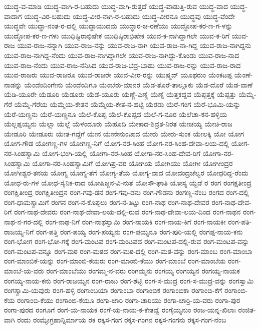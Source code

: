 ಯುದ್ಧ-ವ-ಮಾಡಿ
ಯುದ್ಧ-ವಾಗಿ-ರ-ಬಹುದು
ಯುದ್ಧ-ವಾಗಿ-ರುತ್ತದೆ
ಯುದ್ಧ-ವಾಡುತ್ತಿ-ರುವ
ಯುದ್ಧ-ವಾದ
ಯುದ್ಧ-ವಾದಾಗ
ಯುದ್ಧ-ವಿರ-ಬಹುದು
ಯುದ್ಧ-ವೀರ-ನಾಗಿ-ರ-ಬಹುದು
ಯುದ್ಧ-ವೀರನೂ
ಯುದ್ಧವು
ಯುದ್ಧ-ವೆಂದೇ
ಯುದ್ಧವೇ
ಯುದ್ಧಾ-ನಂತ-ರ-ದಲ್ಲಿ
ಯುದ್ಧಾಯುದಮ
ಯುದ್ಧಾರ-ಚ-ರಣೆಯು
ಯುದ್ಧೋಪ-ಕರ-ಣ-ಗ-ಳನ್ನು
ಯುದ್ಧೋಪ-ಕರ-ಣ-ಗಳು
ಯುಧಿಷ್ಟಿರಾಭಿಷೇಕ
ಯುಧಿಷ್ಠಿರಾಭಿಷೇಕ
ಯುವ-ಕ-ನಾಗಿದ್ದಾಗಲೇ
ಯುವ-ಕ-ರಿಗೆ
ಯುವ-ರಾಜ
ಯುವ-ರಾಜ-ನನ್ನಾಗಿ
ಯುವ-ರಾಜ-ನನ್ನು
ಯುವ-ರಾಜ-ನಾಗಿ
ಯುವ-ರಾಜ-ನಾ-ಗಿದ್ದ
ಯುವ-ರಾಜ-ನಾಗಿದ್ದನು
ಯುವ-ರಾಜ-ನಾಗಿದ್ದ-ನೆಂದು
ಯುವ-ರಾಜ-ನಾಗಿದ್ದಾಗಲೇ
ಯುವ-ರಾಜ-ನಾಗಿದ್ದು-ಕೊಂಡು
ಯುವ-ರಾಜ-ನಾದ
ಯುವ-ರಾಜ-ನೆಂದು
ಯುವ-ರಾಜ-ನೆನಿಸಿದ
ಯುವ-ರಾಜ-ಭದ್ರ-ಬಾಹು
ಯುವ-ರಾಜ-ರನ್ನು
ಯುವ-ರಾಜ-ರಾದ
ಯುವ-ರಾಜರು
ಯುವ-ರಾಜರೂ
ಯುವ-ರಾಜರೇ
ಯುವ-ವೀರ-ರನ್ನು
ಯುಷ್ಮದ್
ಯೂಥರುಂ
ಯೆಂಕಟಪ್ಪ
ಯೆಂಣೆ-ನಾಡನ್ನು
ಯೆಂದೆಂದಿಂಗೇನು
ಯೆಂದೆಂದಿಗೂ
ಯೆಂಬೆರು-ಮಾನರ
ಯೆಡ-ತೊರೆ-ತಾಲ್ಲೂಕು
ಯೆಡ-ದೊರೆ
ಯೆಡ-ವಾಣೆ
ಯೆಡಿ-ಯೂರೇ
ಯೆಡೂರಿ
ಯೆಡೂರು
ಯೆಡೆ-ಯೂರು
ಯೆಣ್ಣೆ-ಎಣ್ಣೆ
ಯೆಣ್ನೆ
ಯೆತ್ತಕದ್ದವ
ಯೆಪ್ಪತ್ತಕ್ಕೆ
ಯೆಪ್ಪತ್ತು
ಯೆಮ್ಮೆ-ಗೆರೆ
ಯೆಮ್ಮೆ-ಗೆರೆಯ
ಯೆಮ್ಮೆಯ-ಕೇತನ
ಯೆಮ್ಮೆಯ-ಕೇತ-ನ-ಹಟ್ಟಿ
ಯೆರಡು
ಯೆರೆ-ಗಂಗ
ಯೆರೆ-ಭೂಮಿ-ಯನ್ನು
ಯೆರೆ-ಯಣ್ಣನು
ಯೆರೆ-ಯಣ್ಣನೂ
ಯೆಲೆ-ಕೊಪ್ಪ
ಯೆಲೆ-ಕೊಪ್ಪದ
ಯೆಲೆ-ಗ-ನೂರ
ಯೆಲೆಚಾ-ಕನ-ಹಳ್ಳಿಯ
ಯೆಲ್ಲಪ್ಪಯ್ಯನು
ಯೆಲ್ಲಾ
ಯೆಲ್ಲೆ
ಯೆಳಂದೂರು
ಯೆಹೂದಿ
ಯೇಕಾದ-ಶಿವ್ರತ-ನಿರತ
ಯೇಚಯ್ಯ
ಯೇಚಿ-ರಾಜ
ಯೇಡೂರಿ
ಯೇಡೂರು
ಯೇತ-ಗದ್ದೆಗೆ
ಯೇನ
ಯೇನೇನುಂಟಾದ
ಯೇರು
ಯೇರು-ಸುಂಕ
ಯೇಲಕ್ಕಿ
ಯೋ
ಯೋಗ
ಯೋಗ-ಗೌಡ
ಯೋಗಣ್ಣ-ಗಳ
ಯೋಗಣ್ಣ-ನಿಗೆ
ಯೋಗ-ನರ-ಸಿಂಹ
ಯೋಗ-ನರ-ಸಿಂಹ-ದೇವಾ-ಲಯ-ದಲ್ಲಿ
ಯೋಗ-ನರ-ಸಿಂಹಸ್ವಾಮಿ
ಯೋಗ-ಭಂಗಿ-ಯಲ್ಲಿ
ಯೋಗಾ-ನರ-ಸಿಂಹ
ಯೋಗಾ-ನರ-ಸಿಂಹ-ದೇವ-ರಿಗೆ
ಯೋಗಾ-ನರ-ಸಿಂಹಸ್ವಾಮಿ
ಯೋಗಾ-ನರ-ಸಿಂಹಸ್ವಾಮಿಗೆ
ಯೋಗಿಪ್ರ-ವರ
ಯೋಗಿಯ
ಯೋಗಿಯು
ಯೋಗೀ
ಯೋಗೀಂದ್ರರ
ಯೋಗೀಶ್ವರ-ತನಯ
ಯೋಗ್ಯ
ಯೋಗ್ಯ-ತೆಗೆ
ಯೋಗ್ಯ-ತೆಯ
ಯೋಗ್ಯ-ವಾದ
ಯೋದಂದ್ರಚೆಲ್ವರ
ಯೋಧರಿದ್ದ-ರೆಂದು
ಯೋಧ-ರು-ಗಳ
ಯೋಧ-ಸೈನಿಕ-ರಾದ
ಯೋಷಿಜ್ಜನ-ವಿ-ನುತೆ
ಯೋಸೌ-ಘಾತಿ
ಯೋಸ್ಯ
ಯ್ದೆಡೆ
ರ
ರಂಗ
ರಂಗಕ್ಷತೀಂದ್ರ
ರಂಗಕ್ಷಿತೀಂದ್ರ
ರಂಗಕ್ಷಿತೀಂದ್ರನ
ರಂಗ-ಗವು-ಡನ
ರಂಗ-ಗವು-ಡನು
ರಂಗ-ಗೌಡನು
ರಂಗಣ್ಣ-ನೆಂಬ
ರಂಗದ
ರಂಗ-ದಲ್ಲಿ
ರಂಗ-ಧಾಮಸ್ವಾಮಿಗೆ
ರಂಗನ
ರಂಗ-ನ-ಕೊಪ್ಪಲು
ರಂಗ-ನ-ತಿಟ್ಟು
ರಂಗ-ನಾಥ
ರಂಗ-ನಾಥ-ದೇವರ
ರಂಗ-ನಾಥ-ದೇವ-ರಿಗೆ
ರಂಗ-ನಾಥ-ದೇವರು
ರಂಗ-ನಾಥ-ದೇವಾ-ಲಯ-ದಲ್ಲಿ-ರುವ
ರಂಗ-ನಾಥ-ದೇವಾ-ಲಯ-ದಿಂದ
ರಂಗ-ನಾಥನ
ರಂಗ-ನಾಥ-ನ-ಗರ-ದಲ್ಲಿ
ರಂಗ-ನಾಥ-ನಿಗೆ
ರಂಗ-ನಾಥಸ್ವಾಮಿ
ರಂಗ-ನಾಯಕಿ
ರಂಗ-ನಾಯ-ಕಿಗೆ
ರಂಗ-ನಾಯಕೀ
ರಂಗ-ಪತಿ-ರಾಜಯ್ಯ-ನಿಗೆ
ರಂಗ-ಪತ್ತಿ
ರಂಗ-ಪಯ್ಯ
ರಂಗ-ಪಯ್ಯನು
ರಂಗ-ಪಯ್ಯನೂ
ರಂಗ-ಪುರಿ-ಯಲ್ಲಿ
ರಂಗಪ್ಪ-ನಾಯ-ಕನು
ರಂಗ-ಭೋಗ
ರಂಗ-ಭೋ-ಗಕ್ಕೆ
ರಂಗ-ಮಂಟಪ
ರಂಗ-ಮಂಟಪದ
ರಂಗ-ಮಂಟಪ-ದಲ್ಲಿ-ರುವ
ರಂಗ-ಮಂಟಪ-ವನ್ನು
ರಂಗ-ಮಂಟಪ-ವನ್ನೂ
ರಂಗ-ಮಠ
ರಂಗ-ಮಠದ
ರಂಗ-ಮಠ-ದಲ್ಲಿ
ರಂಗ-ಮಠ-ವನ್ನು
ರಂಗ-ಮಾಂಬ
ರಂಗ-ಮಾಂಬಾ
ರಂಗ-ಮಾಂಬಿಕೆ-ಯನ್ನು
ರಂಗ-ಮಾಂಬಿ-ಕೆಯರು
ರಂಗ-ಮಾಂಬಿ-ಕೆಯು
ರಂಗ-ಮಾಂಬೆ
ರಂಗ-ಮಾಂಬೆಯ
ರಂಗ-ಮಾಂಬೆ-ಯ-ವರು
ರಂಗ-ಮಾಂಬೆಯು
ರಂಗಮ್ಮ-ನ-ವರು
ರಂಗಮ್ಮನು
ರಂಗಯ್ಯ
ರಂಗಯ್ಯನ
ರಂಗಯ್ಯ-ನಾಯಕ
ರಂಗಯ್ಯ-ನಾಯ-ಕನು
ರಂಗ-ರಾಜಯ್ಯನ
ರಂಗ-ರಾಜು
ರಂಗ-ಶೆಟ್ಟಿ
ರಂಗ-ಸ-ಮುದ್ರ
ರಂಗ-ಸ-ಮುದ್ರ-ವನ್ನು
ರಂಗಸ್ವಾಮಿ
ರಂಗಸ್ವಾಮಿ-ಯವುರು
ರಂಗ-ಹಳ್ಳಿ
ರಂಗಾಂಬಯಾ
ರಂಗಾಂಬಾ
ರಂಗಾಂಬಿಕ
ರಂಗಾಂಬಿಕಾ
ರಂಗಾಂಬಿ-ಕೆಗೆ
ರಂಗಾಂಬಿ-ಕೆಯ
ರಂಗಾಂಬಿ-ಕೆಯು
ರಂಗಾಂಬಿ-ಕೆಯೂ
ರಂಗಾ-ಚಾರಿ
ರಂಗಾ-ಚಾರಿಯು
ರಂಗಾ-ಚಾರ್ರಿ-ಯ-ವರು
ರಂಗಾ-ಪುರ
ರಂಗಾ-ಪುರದ
ರಂಗೂಗೆ
ರಂಗೆ-ಯ-ನಾಯಕ
ರಂಗೆ-ಯ-ನಾಯ-ಕ-ಕೇತವ್ವೆ
ರಂಗೈಯ್ಯನುಂ
ರಂಜ-ಯನ್ನ-ಖಿಲಾಃ
ರಂಜಿತ-ವಾಗಿ
ರಂದು
ರಂಮ್ಯೇಗ್ರಹಾನ್ನಿರ್ಮಾಯ
ರಕ
ರಕ್ಕಸ-ಗಂಗ
ರಕ್ಕಸ-ಗಂಗನ
ರಕ್ಕಸ-ಗಂಗನು
ರಕ್ಕಸ-ಗಂಗ-ನೆಂಬ
